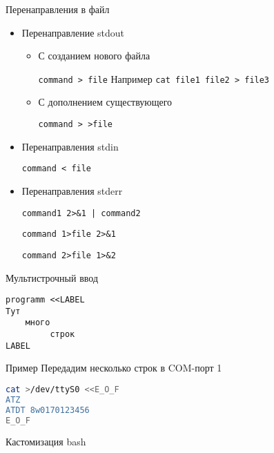 \documentclass[ignorenonframetext, professionalfonts, hyperref={pdftex, unicode}]{beamer}
\begin{document}
\begin{frame}{Перенаправления в файл}
\begin{itemize}
\item Перенаправление stdout 
\begin{itemize}
\item С созданием нового файла

{\tt command > file} Например {\tt cat file1 file2 > file3}
\item С дополнением существующего

{\tt command > >file}
\end{itemize}
\pause
\item Перенаправления stdin

{\tt command < file}
\pause
\item Перенаправления stderr

{\tt command1 2>\&1 | command2}

{\tt command 1>file 2>\&1}

{\tt command 2>file 1>\&2}
\end{itemize}
\end{frame}

\begin{frame}[fragile]{Мультистрочный ввод}

\begin{verbatim}
programm <<LABEL
Тут
    много
	     строк
LABEL
\end{verbatim}

	\pause
	\begin{block}{Пример}
	Передадим несколько строк в COM-порт 1
\begin{lstlisting}[language=bash]
cat >/dev/ttyS0 <<E_O_F
ATZ
ATDT 8w0170123456
E_O_F
\end{lstlisting}
	\end{block}
\end{frame}

\begin{frame}{Кастомизация bash}
\end{frame}
\end{document}
